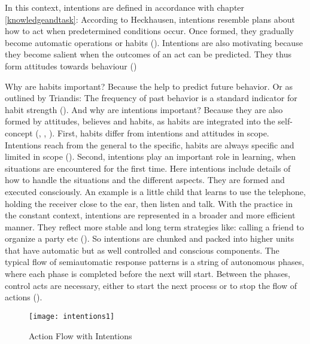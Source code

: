 In this context, intentions are defined in accordance with chapter \ref{knowledgeandtask}: According to Heckhausen, intentions resemble plans about how to act when predetermined conditions occur. Once formed, they gradually become automatic operations or habits (\cite{heckhausen1990intentional}). Intentions are also motivating because they become salient when the outcomes of an act can be predicted. They thus form attitudes towards behaviour (\cite{ouellette1998habit})

Why are habits important? Because the help to predict future behavior. Or as outlined by Triandis: The frequency of past behavior is a standard indicator for habit strength (\cite{triandis1979values}). And why are intentions important? Because they are also formed by attitudes, believes and habits, as habits are integrated into the self-concept (\cite{ouellette1998habit}, \cite{festinger1962theory}, \cite{bem1973self}). First, habits differ from intentions and attitudes in scope. Intentions reach from the general to the specific, habits are always specific and limited in scope (\cite{allport1935attitudes}). Second, intentions play an important role in learning, when situations are encountered for the first time. Here intentions include details of how to handle the situations and the different aspects. They are formed and executed consciously. An example is a little child that learns to use the telephone, holding the receiver close to the ear, then listen and talk. With the practice in the constant context, intentions are represented in a broader and more efficient manner. They reflect more stable and long term strategies like: calling a friend to organize a party etc (\cite{heckhausen1990intentional}). So intentions are chunked and packed into higher units that have automatic but as well controlled and conscious components. The typical flow of semiautomatic response patterns is a string of autonomous phases, where each phase is completed before the next will start. Between the phases, control acts are necessary, either to start the next process or to stop the flow of actions (\cite{bargh1989conditional}). 

\begin{figure}[ht]
	\centering
  \texttt{[image: intentions1]}
	\caption{Action Flow with Intentions}
	\label{fig5}
\end{figure}

